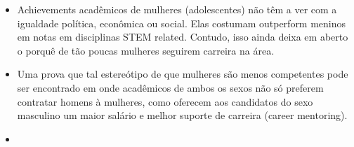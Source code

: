 \begin{itemize}
	\item Achievements acadêmicos de mulheres (adolescentes) não têm a ver com a igualdade política, econômica ou social. Elas costumam outperform meninos em notas em disciplinas STEM related. Contudo, isso ainda deixa em aberto o porquê de tão poucas mulheres seguirem carreira na área. \cite{stoet2015sex}
	\item Uma prova que tal estereótipo de que mulheres são menos competentes pode ser encontrado em \cite{moss2012science} onde acadêmicos de ambos os sexos não só preferem contratar homens à mulheres, como oferecem aos candidatos do sexo masculino um maior salário e melhor suporte de carreira (career mentoring).
	\item 
\end{itemize}


